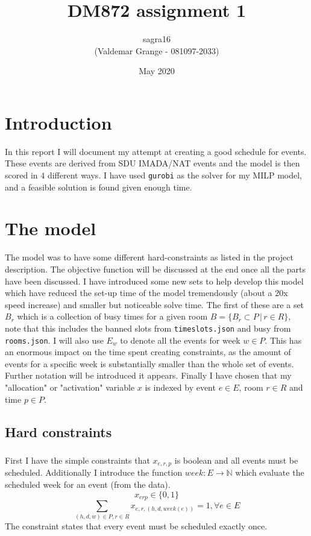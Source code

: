 \documentclass{article}
\title{DM872 assignment 1}
\author{sagra16 \\(Valdemar Grange - 081097-2033) }
\date{May 2020}
\begin{document}
    \maketitle

    \section{Introduction}
    In this report I will document my attempt at creating a good schedule for events.
    These events are derived from SDU IMADA/NAT events and the model is then scored in $4$ different ways.
    I have used \texttt{gurobi} as the solver for my MILP model, and a feasible solution is found given enough time.

    \section{The model}
    The model was to have some different hard-constraints as listed in the project description.
    The objective function will be discussed at the end once all the parts have been discussed.
    I have introduced some new sets to help develop this model which have reduced the set-up time of the model tremendously (about a 20x speed increase) and smaller but noticeable solve time.
    The first of these are a set $B_r$ which is a collection of busy times for a given room $B = \{ B_r \subset P \,|\, r \in R \}$, note that this includes the banned slots from \texttt{timeslots.json} and busy from \texttt{rooms.json}.
    I will also use $E_w$ to denote all the events for week $w \in P$.
    This has an enormous impact on the time spent creating constraints, as the amount of events for a specific week is substantially smaller than the whole set of events.
    Further notation will be introduced it appears.
    Finally I have chosen that my "allocation" or "activation" variable $x$ is indexed by event $e \in E$, room $r \in R$ and time $p \in P$.
    \subsection{Hard constraints}
    \subsubsection{}
    First I have the simple constraints that $x_{e,r,p}$ is boolean and all events must be scheduled.
    Additionally I introduce the function $week: E \rightarrow \mathbb{N}$ which evaluate the scheduled week for an event (from the data).
    \[x_{erp} \in \{0, 1\}\]
    \[\sum_{(h,d,w) \in P, r \in R} x_{e,r,(h,d,week(e))} = 1, \forall e \in E\]
    The constraint states that every event must be scheduled exactly once.
\end{document}
